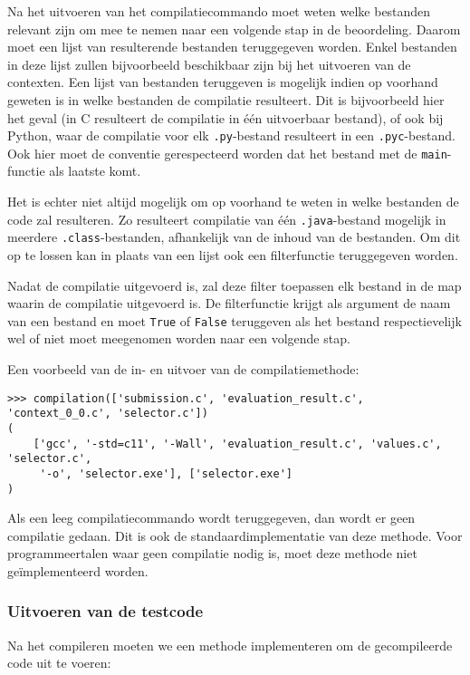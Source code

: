 Na het uitvoeren van het compilatiecommando moet \tested{} weten welke bestanden relevant zijn om mee te nemen naar een volgende stap in de beoordeling.
Daarom moet een lijst van resulterende bestanden teruggegeven worden.
Enkel bestanden in deze lijst zullen bijvoorbeeld beschikbaar zijn bij het uitvoeren van de contexten.
Een lijst van bestanden teruggeven is mogelijk indien op voorhand geweten is in welke bestanden de compilatie resulteert.
Dit is bijvoorbeeld hier het geval (in C resulteert de compilatie in één uitvoerbaar bestand), of ook bij Python, waar de compilatie voor elk \texttt{.py}-bestand resulteert in een \texttt{.pyc}-bestand.
Ook hier moet de conventie gerespecteerd worden dat het bestand met de \texttt{main}-functie als laatste komt.

Het is echter niet altijd mogelijk om op voorhand te weten in welke bestanden de code zal resulteren.
Zo resulteert compilatie van één \texttt{.java}-bestand mogelijk in meerdere \texttt{.class}-bestanden, afhankelijk van de inhoud van de bestanden.
Om dit op te lossen kan in plaats van een lijst ook een filterfunctie teruggegeven worden.

Nadat de compilatie uitgevoerd is, zal \tested{} deze filter toepassen elk bestand in de map waarin de compilatie uitgevoerd is.
De filterfunctie krijgt als argument de naam van een bestand en moet \texttt{True} of \texttt{False} teruggeven als het bestand respectievelijk wel of niet moet meegenomen worden naar een volgende stap.

Een voorbeeld van de in- en uitvoer van de compilatiemethode:

\begin{verbatim}
>>> compilation(['submission.c', 'evaluation_result.c', 'context_0_0.c', 'selector.c'])
(
    ['gcc', '-std=c11', '-Wall', 'evaluation_result.c', 'values.c', 'selector.c',
     '-o', 'selector.exe'], ['selector.exe']
)
\end{verbatim}

Als een leeg compilatiecommando wordt teruggegeven, dan wordt er geen compilatie gedaan.
Dit is ook de standaardimplementatie van deze methode.
Voor programmeertalen waar geen compilatie nodig is, moet deze methode niet geïmplementeerd worden.

\subsubsection{Uitvoeren van de testcode}

Na het compileren moeten we een methode implementeren om de gecompileerde code uit te voeren:

